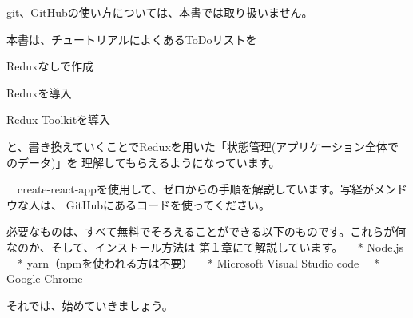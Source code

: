 git、GitHubの使い方については、本書では取り扱いません。

本書は、チュートリアルによくあるToDoリストを\\[0pt]

\begin{starterenumerate}
\item Reduxなしで作成
\item Reduxを導入
\item Redux Toolkitを導入
\end{starterenumerate}

と、書き換えていくことでReduxを用いた「状態管理(アプリケーション全体でのデータ)」を
理解してもらえるようになっています。

　create{-}react{-}appを使用して、ゼロからの手順を解説しています。写経がメンドウな人は、
GitHubにあるコードを使ってください。

必要なものは、すべて無料でそろえることができる以下のものです。これらが何なのか、そして、インストール方法は
第１章にて解説しています。
　* Node.js
　* yarn（npmを使われる方は不要）
　* Microsoft Visual Studio code
　* Google Chrome

それでは、始めていきましょう。
